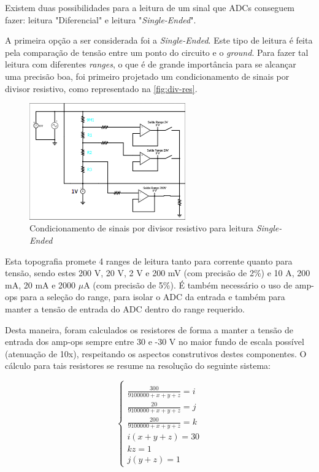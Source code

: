 Existem duas possibilidades para a leitura de um sinal que \gls{ADC}s conseguem fazer: leitura "Diferencial" e leitura "\textit{Single-Ended}".

A primeira opção a ser considerada foi a \textit{Single-Ended}. Este tipo de leitura é feita pela comparação de tensão entre um ponto do circuito e o \textit{ground}. Para fazer tal leitura com diferentes \textit{ranges}, o que é de grande importância para se alcançar uma precisão boa, foi primeiro projetado um condicionamento de sinais por divisor resistivo, como representado na \autoref{fig:div-res}.

\begin{figure}[htb!]
    \caption{Condicionamento de sinais por divisor resistivo para leitura \textit{Single-Ended}}
    \label{fig:div-res}
    \includegraphics[width=0.6\textwidth]{figuras/div-res.png}
    \fonte{}
\end{figure}

Esta topografia promete 4 ranges de leitura tanto para corrente quanto para tensão, sendo estes 200 V, 20 V, 2 V e 200 mV (com precisão de 2\%) e 10 A, 200 mA, 20 mA e 2000 $\mu$A (com precisão de 5\%). É também necessário o uso de \gls{amp-op}s para a seleção do range, para isolar o \gls{ADC} da entrada e também para manter a tensão de entrada do \gls{ADC} dentro do range requerido.

Desta maneira, foram calculados os resistores de forma a manter a tensão de entrada dos \gls{amp-op}s sempre entre 30 e -30 V no maior fundo de escala possível (atenuação de 10x), respeitando os aspectos construtivos destes componentes. O cálculo para tais resistores se resume na resolução do seguinte sistema:

\begin{equation}
    \label{eq01}
    \left\{\begin{matrix}
        \\ \frac{300}{9100000+x+y+z} = i
        \\ \frac{20}{9100000+x+y+z} = j
        \\ \frac{200}{9100000+x+y+z} = k
        \\ i (x+y+z) = 30
        \\ kz = 1
        \\ j(y+z) = 1
    \end{matrix}\right.
\end{equation}

